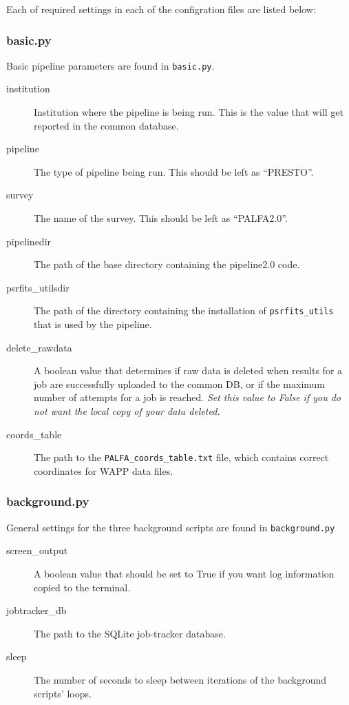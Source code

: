 Each of required settings in each of the configration files are listed below:

\subsubsection{basic.py}
Basic pipeline parameters are found in \texttt{basic.py}.

\begin{description}
    \item[institution] Institution where the pipeline is being run. This is the value that will get reported in the common database.
    \item[pipeline] The type of pipeline being run. This should be left as ``PRESTO''.
    \item[survey] The name of the survey. This should be left as ``PALFA2.0''.
    \item[pipelinedir] The path of the base directory containing the pipeline2.0 code.
    \item[psrfits\_utilsdir] The path of the directory containing the installation of \texttt{psrfits\_utils} that is used by the pipeline.
    \item[delete\_rawdata] A boolean value that determines if raw data is deleted when results for a job are successfully uploaded to the common DB, or if the maximum number of attempts for a job is reached. \textit{Set this value to False if you do not want the local copy of your data deleted.}
    \item[coords\_table] The path to the \texttt{PALFA\_coords\_table.txt} file, which contains correct coordinates for WAPP data files.
\end{description}

\subsubsection{background.py}
General settings for the three background scripts are found in \texttt{background.py}

\begin{description}
    \item[screen\_output] A boolean value that should be set to True if you want log information copied to the terminal.
    \item[jobtracker\_db] The path to the SQLite job-tracker database.
    \item[sleep] The number of seconds to sleep between iterations of the background scripts' loops.
\end{description}


